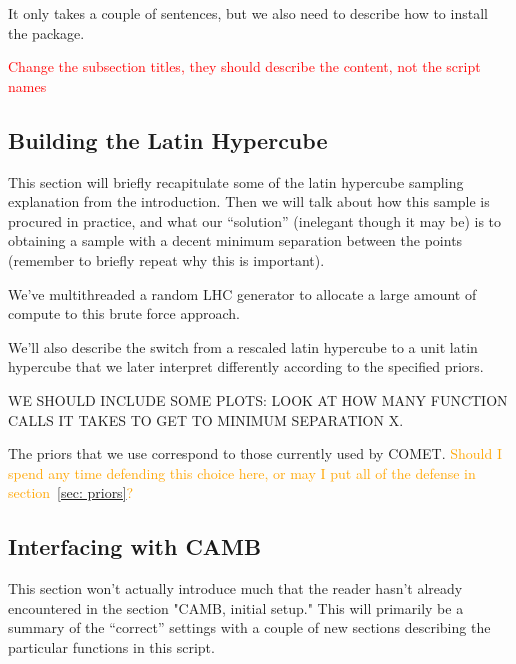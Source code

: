 \documentclass[11pt]{article}
\begin{document}
It only takes a couple of sentences, but we also need to describe how to install the package.

\textcolor{red}{Change the subsection titles, they should describe the content, not the script names}

\begin{centering}
\subsection{Building the Latin Hypercube}
\label{sec: build_lhc}
\end{centering}


This section will briefly recapitulate some of the latin hypercube sampling explanation from the introduction. Then we will talk about how this sample is procured in practice, and what our ``solution'' (inelegant though it may be) is to obtaining a sample with a decent minimum separation between the points (remember to briefly repeat why this is important).

We've multithreaded a random LHC generator to allocate a large amount of compute to this brute force approach.

We'll also describe the switch from a rescaled latin hypercube to a unit latin hypercube that we later interpret differently according to the specified priors.

WE SHOULD INCLUDE SOME PLOTS: LOOK AT HOW MANY FUNCTION CALLS IT TAKES TO GET
TO MINIMUM SEPARATION X.


The priors that we use correspond to those currently used by COMET. \textcolor{orange}{Should I spend any time defending this choice here, or may I put all of the defense in section~\ref{sec: priors}?}

\begin{centering}
\subsection{Interfacing with CAMB}
\end{centering}


This section won't actually introduce much that the reader hasn't already encountered in the section "CAMB, initial setup." This will primarily be a summary of the ``correct'' settings with a couple of new sections describing the particular functions in this script.
\end{document}
